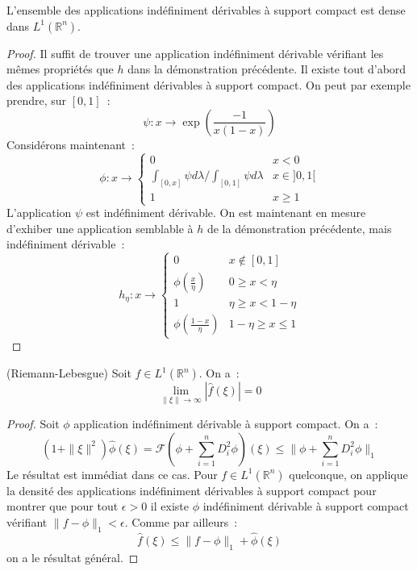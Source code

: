 \begin{prop}\label{dens:1}
L'ensemble des applications indéfiniment dérivables à support compact
est dense dans $L^1(\mathbb{R}^n)$. 
\end{prop}
\begin{proof}
Il suffit de trouver une application indéfiniment dérivable vérifiant
les mêmes propriétés que $h$ dans la démonstration précédente. Il
existe tout d'abord des applications indéfiniment dérivables à support
compact. On peut par exemple prendre, sur $[0,1]$~:
\[
\psi : x \to \exp \left (
\frac{-1}{x(1-x)}
\right )
\]
Considérons maintenant~:
\[
\phi : x \to \left  \{
\begin{array}{ll}
0 & x < 0 \\
\int_{[0,x]} \psi d \lambda / \int_{[0,1]} \psi d \lambda & x \in ]0,
1[ \\
1 & x \geq 1
\end{array}
\right .
\]
L'application $\psi$ est indéfiniment dérivable. On est maintenant en
mesure d'exhiber une application semblable à $h$ de la démonstration
précédente, mais indéfiniment dérivable~:
\[
h_\eta : x \to \left  \{
\begin{array}{ll}
0 & x \notin [0,1] \\
\phi \left (\frac{x}{\eta} \right ) & 0 \geq x < \eta \\
1 & \eta \geq x < 1-\eta \\
\phi \left (\frac{1-x}{\eta} \right ) & 1-\eta \geq x \leq 1
\end{array}
\right .
\]
\end{proof}
\begin{mandatory}
\begin{theorem} (Riemann-Lebesgue)
Soit $f \in L^1(\mathbb{R}^n)$. On a~:
\[
\lim_{\| \xi \| \to \infty} |\widehat{f}(\xi)| = 0
\]
\end{theorem}
\end{mandatory}
\begin{proof}
Soit $\phi$ application indéfiniment dérivable à support compact. On
a~:
\[
(1+\| \xi \|^2) \widehat{\phi}(\xi) = \mathcal{F}\left(\phi + \sum_{i=1}^n
  D^2_i \phi \right)(\xi) \leq \| \phi + \sum_{i=1}^n
  D^2_i \phi \|_1
\]
Le résultat est immédiat dans ce cas. Pour $f \in L^1(\mathbb{R}^n)$
quelconque, on applique la densité des applications indéfiniment
dérivables à support compact pour montrer que pour tout $\epsilon > 0$
il existe $\phi$ indéfiniment dérivable à support compact vérifiant
$\| f - \phi \|_1 < \epsilon$. Comme par ailleurs~:
\[
\widehat{f}(\xi) \leq \| f- \phi \|_1 + \widehat{\phi}(\xi)
\]
on a le résultat général.
\end{proof}
